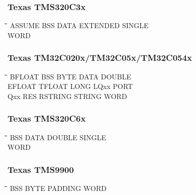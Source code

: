 \subsubsection{Texas TMS320C3x}
{\tt\begin{tabbing}
\hspace{3cm}\=\hspace{3cm}\=\hspace{3cm}\=\hspace{3cm}\=\kill
ASSUME     \> BSS         \> DATA        \> EXTENDED    \> SINGLE \\
WORD \\
\end{tabbing}}

\subsubsection{Texas TM32C020x/TM32C05x/TM32C054x}
{\tt\begin{tabbing}
\hspace{3cm}\=\hspace{3cm}\=\hspace{3cm}\=\hspace{3cm}\=\kill
BFLOAT     \> BSS         \> BYTE        \> DATA        \> DOUBLE \\
EFLOAT     \> TFLOAT      \> LONG        \> LQxx        \> PORT \\
Qxx        \> RES         \> RSTRING     \> STRING      \> WORD \\
\end{tabbing}}

\subsubsection{Texas TMS320C6x}
{\tt\begin{tabbing}
\hspace{3cm}\=\hspace{3cm}\=\hspace{3cm}\=\hspace{3cm}\=\kill
BSS         \> DATA        \> DOUBLE     \> SINGLE \\
WORD \\
\end{tabbing}}

\subsubsection{Texas TMS9900}
{\tt\begin{tabbing}
\hspace{3cm}\=\hspace{3cm}\=\hspace{3cm}\=\hspace{3cm}\=\kill
BSS        \> BYTE        \> PADDING     \> WORD \\
\end{tabbing}}

